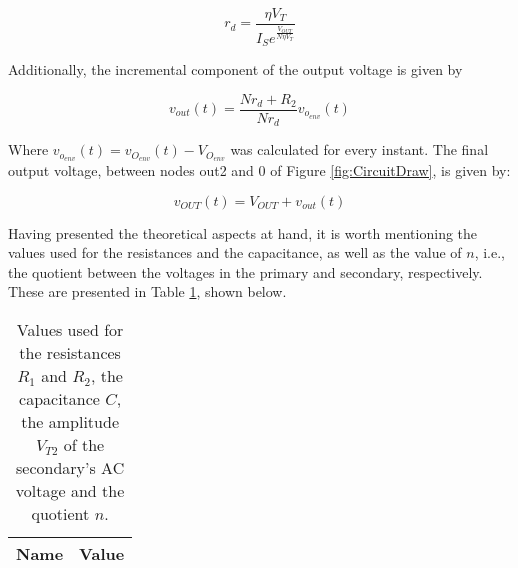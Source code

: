 \begin{equation} \label{eq:incremental_resistance}
  r_d=\frac{\eta V_T}{I_Se^{\frac{V_{OUT}}{N\eta V_T}}}
\end{equation}

Additionally, the incremental component of the output voltage is given by

\begin{equation} \label{eq:incremental_voltage}
  v_{out}(t)=\frac{Nr_d+R_2}{Nr_d}v_{o_{env}}(t)
\end{equation}

Where $v_{o_{env}}(t)=v_{O_{env}}(t)-V_{O_{env}}$ was calculated for every instant. The final output voltage, between nodes out2 and 0 of Figure \ref{fig:CircuitDraw}, is given by:

\begin{equation} \label{eq:final_output_voltage}
  v_{OUT}(t)=V_{OUT}+v_{out}(t)
\end{equation}

Having presented the theoretical aspects at hand, it is worth mentioning the values used for the resistances and the capacitance, as well as the value of $n$, i.e., the quotient between the voltages in the primary and secondary, respectively. These are presented in Table \ref{tab:ChosenValues}, shown below.

\begin{table}[H]
  \centering
  \begin{tabular}{|c|c|}
    \hline    
    {\bf Name} & {\bf Value} \\ \hline
  \end{tabular}
  \caption{Values used for the resistances $R_1$ and $R_2$, the capacitance $C$, the amplitude $V_{T2}$ of the secondary's AC voltage and the quotient $n$.}
  \label{tab:ChosenValues}
\end{table}

